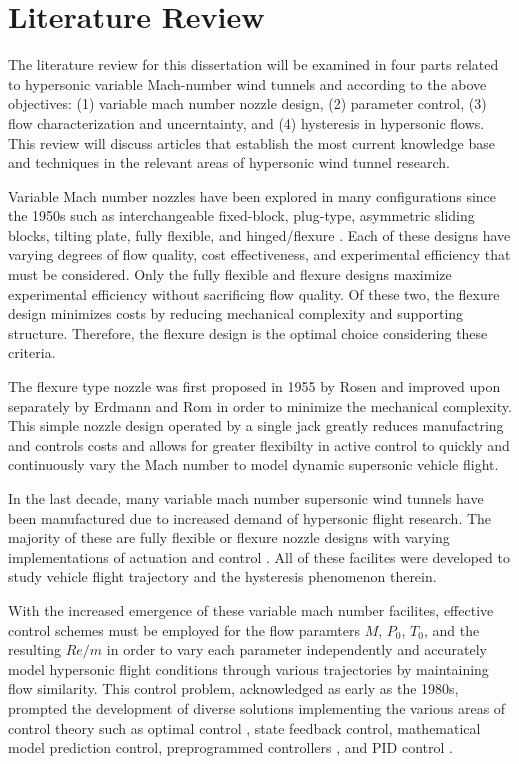\section{Literature Review}

The literature review for this dissertation will be examined in four parts related to hypersonic variable Mach-number wind tunnels and according to the above objectives: (1) variable mach number nozzle design, (2) parameter control, (3) flow characterization and uncerntainty, and (4) hysteresis in hypersonic flows. This review will discuss articles that establish the most current knowledge base and techniques in the relevant areas of hypersonic wind tunnel research.

Variable Mach number nozzles have been explored in many configurations since the 1950s such as interchangeable fixed-block, plug-type, asymmetric sliding blocks, tilting plate, fully flexible, and hinged/flexure \cite{agard-ag-3}. Each of these designs have varying degrees of flow quality, cost effectiveness, and experimental efficiency that must be considered. Only the fully flexible and flexure designs maximize experimental efficiency without sacrificing flow quality. Of these two, the flexure design minimizes costs by reducing mechanical complexity and supporting structure. Therefore, the flexure design is the optimal choice considering these criteria.

The flexure type nozzle was first proposed in 1955 by Rosen \cite{rosen} and improved upon separately by Erdmann and Rom \cite{erdmann,rom} in order to minimize the mechanical complexity. This simple nozzle design operated by a single jack greatly reduces manufactring and controls costs and allows for greater flexibilty in active control to quickly and continuously vary the Mach number to model dynamic supersonic vehicle flight.

In the last decade, many variable mach number supersonic wind tunnels have been manufactured due to increased demand of hypersonic flight research. The majority of these are fully flexible or flexure nozzle designs with varying implementations of actuation and control \cite{durand,laguarda,chen,guo,lv,qi,steeves}. All of these facilites were developed to study vehicle flight trajectory and the hysteresis phenomenon therein.

With the increased emergence of these variable mach number facilites, effective control schemes must be employed for the flow paramters $M$, $P_0$, $T_0$, and the resulting $Re/m$ in order to vary each parameter independently and accurately model hypersonic flight conditions through various trajectories by maintaining flow similarity. This control problem, acknowledged as early as the 1980s, prompted the development of diverse solutions implementing the various areas of control theory such as optimal control \cite{kraft,hwang}, state feedback control, mathematical model prediction control, preprogrammed controllers \cite{matsumoto}, and PID control \cite{fung,ilic-2}.

